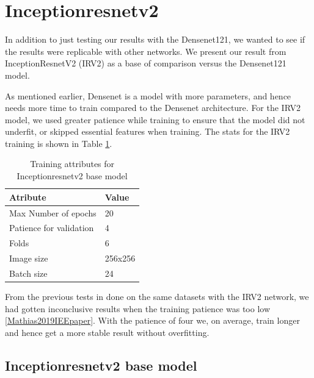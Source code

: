 

\FloatBarrier
\section{Inceptionresnetv2}
In addition to just testing our results with the Densenet121, we wanted to see if the results were replicable with other networks. We present our result from InceptionResnetV2 (IRV2) as a base of comparison versus the Densenet121 model. 


As mentioned earlier, Densenet is a model with more parameters, and hence needs more time to train compared to the Densenet architecture. 
For the IRV2 model, we used greater patience while training to ensure that the model did not underfit, or skipped essential features when training.
The stats for the IRV2 training is shown in Table \ref{tab:TrainingAttrIRV2}.



\begin{table}[h]
\caption{Training attributes for Inceptionresnetv2 base model }
\begin{center}
\begin{tabular}{ll}
\toprule
Atribute                & Value   \\
\midrule
Max Number of epochs    & 20      \\
Patience for validation & 4       \\
Folds                   & 6       \\
Image size              & 256x256 \\
Batch size              & 24      \\   
\bottomrule
\end{tabular}
\end{center}
\label{tab:TrainingAttrIRV2}
\end{table}

From the previous tests in done on the same datasets with the IRV2 network, we had gotten inconclusive results when the training patience was too low \ref{Mathias2019IEEpaper}. With the patience of four we, on average, train longer and hence get a more stable result without overfitting.

\subsection{Inceptionresnetv2 base model}

